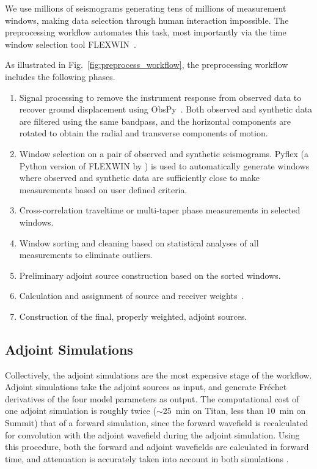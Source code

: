 \documentclass[extra,mreferee]{gji}
\begin{document}
We use millions of seismograms generating tens of millions of measurement windows,
making data selection through human interaction impossible.
The preprocessing workflow automates this task,
most importantly via the time window selection tool FLEXWIN~\citep{maggi2009automated}.

As illustrated in Fig.~\ref{fig:preprocess_workflow}, the preprocessing workflow
includes the following phases.
\begin{enumerate}
  \item Signal processing to remove the instrument response from observed data
    to recover ground displacement using ObsPy~\citep{obspy2010}. Both observed and synthetic data are filtered using the same bandpass, and the horizontal components are rotated to obtain the radial and transverse components of motion.
  \item Window selection on a pair of
    observed and synthetic seismograms. Pyflex (a Python version
    of FLEXWIN by \citet{krischer2015}) is
    used to automatically generate windows where observed and
    synthetic data are sufficiently close to make measurements based on user defined
    criteria.
  \item Cross-correlation traveltime or multi-taper phase measurements in selected windows.
  \item Window sorting and cleaning based on statistical analyses of all measurements to eliminate outliers.
  \item Preliminary adjoint source construction based on the sorted windows.
  \item Calculation and assignment of source and receiver weights~\citep{Ruanetal2018}.
  \item Construction of the final, properly weighted, adjoint sources.
\end{enumerate}

\subsection{Adjoint Simulations}

Collectively,
the adjoint simulations are the most expensive stage of the workflow. 
Adjoint simulations take the adjoint sources as input, and generate Fr\'echet
derivatives of the four model parameters as output.
The computational cost of one adjoint simulation is roughly twice ($\sim25$~min on Titan, less than $10$~min on Summit) that of
a forward simulation, since the forward wavefield is recalculated for convolution with
the adjoint wavefield during the adjoint simulation.
Using this procedure,
both the forward and adjoint wavefields are calculated in forward time,
and attenuation is accurately taken into account in both simulations \citep{KoXiBoPeSaLiTr16}.
\end{document}
